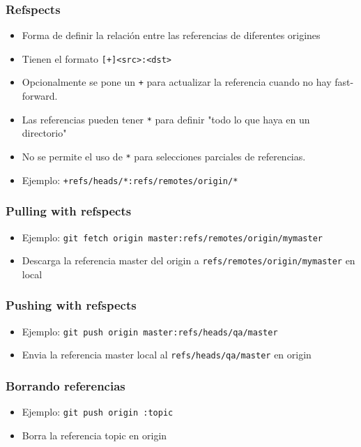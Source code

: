 \documentclass[10pt]{beamer}
\begin{document}
  \begin{frame}[containsverbatim]
    \frametitle{Refspects}
    \begin{itemize}
        \item Forma de definir la relación entre las referencias de diferentes origines
        \item Tienen el formato \verb$[+]<src>:<dst>$
        \item Opcionalmente se pone un \verb$+$ para actualizar la referencia cuando no hay fast-forward.
        \item Las referencias pueden tener \verb$*$ para definir "todo lo que haya en un directorio"
        \item No se permite el uso de \verb$*$ para selecciones parciales de referencias.
        \item Ejemplo: \verb$+refs/heads/*:refs/remotes/origin/*$
    \end{itemize}
  \end{frame}

  \begin{frame}[containsverbatim]
    \frametitle{Pulling with refspects}
    \begin{itemize}
        \item Ejemplo: \verb$git fetch origin master:refs/remotes/origin/mymaster$
        \item Descarga la referencia master del origin a \verb$refs/remotes/origin/mymaster$ en local
    \end{itemize}
  \end{frame}

  \begin{frame}[containsverbatim]
    \frametitle{Pushing with refspects}
    \begin{itemize}
        \item Ejemplo: \verb$git push origin master:refs/heads/qa/master$
        \item Envia la referencia master local al \verb$refs/heads/qa/master$ en origin
    \end{itemize}
  \end{frame}

  \begin{frame}[containsverbatim]
    \frametitle{Borrando referencias}
    \begin{itemize}
        \item Ejemplo: \verb$git push origin :topic$
        \item Borra la referencia topic en origin
    \end{itemize}
  \end{frame}
\end{document}
